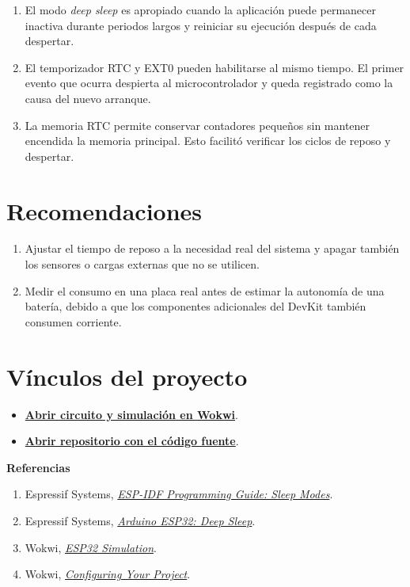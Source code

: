 \documentclass{article}
\begin{document}
\begin{enumerate}
  \item El modo \textit{deep sleep} es apropiado cuando la aplicación puede permanecer inactiva durante periodos largos y reiniciar su ejecución después de cada despertar.
  \item El temporizador RTC y EXT0 pueden habilitarse al mismo tiempo. El primer evento que ocurra despierta al microcontrolador y queda registrado como la causa del nuevo arranque.
  \item La memoria RTC permite conservar contadores pequeños sin mantener encendida la memoria principal. Esto facilitó verificar los ciclos de reposo y despertar.
\end{enumerate}

\section{Recomendaciones}

\begin{enumerate}
  \item Ajustar el tiempo de reposo a la necesidad real del sistema y apagar también los sensores o cargas externas que no se utilicen.
  \item Medir el consumo en una placa real antes de estimar la autonomía de una batería, debido a que los componentes adicionales del DevKit también consumen corriente.
\end{enumerate}

\section{Vínculos del proyecto}

\begin{itemize}
  \item \href{https://wokwi.com/projects/471748304593999873}{\textbf{Abrir circuito y simulación en Wokwi}}.
  \item \href{https://github.com/JdesaG/tarea6-esp32-gestion-energia}{\textbf{Abrir repositorio con el código fuente}}.
\end{itemize}

\vspace{0.5em}
\noindent\textbf{Referencias}

{\footnotesize
\begin{enumerate}
  \setlength{\itemsep}{0pt}
  \setlength{\parskip}{0pt}
  \setlength{\parsep}{0pt}
  \item Espressif Systems, \href{https://docs.espressif.com/projects/esp-idf/en/latest/esp32/api-reference/system/sleep_modes.html}{\textit{ESP-IDF Programming Guide: Sleep Modes}}.
  \item Espressif Systems, \href{https://docs.espressif.com/projects/arduino-esp32/en/latest/api/deepsleep.html}{\textit{Arduino ESP32: Deep Sleep}}.
  \item Wokwi, \href{https://docs.wokwi.com/guides/esp32}{\textit{ESP32 Simulation}}.
  \item Wokwi, \href{https://docs.wokwi.com/vscode/project-config}{\textit{Configuring Your Project}}.
\end{enumerate}
}
\end{document}
